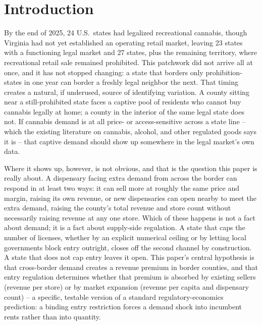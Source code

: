 \documentclass[12pt]{article}
\begin{document}
\begin{singlespace}
\begin{abstract}
\vspace{0.5em}
\noindent\textbf{JEL codes:} L51, H71, R12, L81
\vspace{0.3em}

\noindent\textbf{Keywords:} cannabis, cross-border shopping, market entry, license caps, entry regulation
\end{abstract}
\end{singlespace}

\section{Introduction}
\label{sec:intro}

By the end of 2025, 24 U.S.\ states had legalized recreational cannabis, though Virginia had not yet
established an operating retail market, leaving 23 states with a functioning legal market and 27 states,
plus the remaining territory, where recreational retail sale remained prohibited. This patchwork did not
arrive all at once, and it has not stopped changing: a state that borders only prohibition-states in one year
can border a freshly legal neighbor the next. That timing creates a natural, if underused, source of
identifying variation. A county sitting near a still-prohibited state faces a captive pool of residents who
cannot buy cannabis legally at home; a county in the interior of the same legal state does not. If cannabis
demand is at all price- or access-sensitive across a state line -- which the existing literature on cannabis,
alcohol, and other regulated goods says it is -- that captive demand should show up somewhere in the legal
market's own data.

Where it shows up, however, is not obvious, and that is the question this paper is really about. A dispensary
facing extra demand from across the border can respond in at least two ways: it can sell more at roughly the
same price and margin, raising its own revenue, or new dispensaries can open nearby to meet the extra demand,
raising the county's total revenue and store count without necessarily raising revenue at any one store. Which
of these happens is not a fact about demand; it is a fact about supply-side regulation. A state that caps the
number of licenses, whether by an explicit numerical ceiling or by letting local governments block entry
outright, closes off the second channel by construction. A state that does not cap entry leaves it open. This
paper's central hypothesis is that cross-border demand creates a revenue premium in border counties, and that
entry regulation determines whether that premium is absorbed by existing sellers (revenue per store) or by
market expansion (revenue per capita and dispensary count) -- a specific, testable version of a standard
regulatory-economics prediction: a binding entry restriction forces a demand shock into incumbent rents rather
than into quantity.
\end{document}
